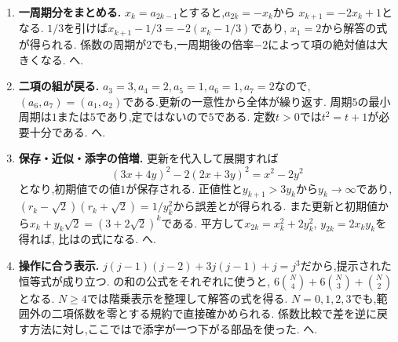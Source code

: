 \begin{enumerate}[label=\textbf{問\arabic*.},format=\bookitemlink{practice-connections}{solution}{problem}]
    \item \textbf{一周期分をまとめる.}
      $x_k=a_{2k-1}$とすると,$a_{2k}=-x_k$から
      $x_{k+1}=-2x_k+1$となる.
      $1/3$を引けば$x_{k+1}-1/3=-2(x_k-1/3)$であり,
      $x_1=2$から解答の式が得られる.
      係数の周期が$2$でも,一周期後の倍率$-2$によって項の絶対値は大きくなる.
      へ.
    \item \textbf{二項の組が戻る.}
      $a_3=3,a_4=2,a_5=1,a_6=1,a_7=2$なので,
      $(a_6,a_7)=(a_1,a_2)$である.更新の一意性から全体が繰り返す.
      周期$5$の最小周期は$1$または$5$であり,定ではないので$5$である.
      定数$t>0$では$t^2=t+1$が必要十分である.
      へ.
    \item \textbf{保存・近似・添字の倍増.}
      更新を代入して展開すれば
      \[
        (3x+4y)^2-2(2x+3y)^2=x^2-2y^2
      \]
      となり,初期値での値$1$が保存される.
      正値性と$y_{k+1}>3y_k$から$y_k\to\infty$であり,
      $(r_k-\sqrt2)(r_k+\sqrt2)=1/y_k^2$から誤差とが得られる.
      また更新と初期値から$x_k+y_k\sqrt2=(3+2\sqrt2)^k$である.
      平方して$x_{2k}=x_k^2+2y_k^2$, $y_{2k}=2x_ky_k$を得れば,
      比はの式になる.
      へ.
    \item \textbf{操作に合う表示.}
      $j(j-1)(j-2)+3j(j-1)+j=j^3$だから,提示された恒等式が成り立つ.
      の和の公式をそれぞれに使うと,
      $6\binom N4+6\binom N3+\binom N2$となる.
      $N\ge4$では階乗表示を整理して解答の式を得る.
      $N=0,1,2,3$でも,範囲外の二項係数を零とする規約で直接確かめられる.
      係数比較で差を逆に戻す方法に対し,ここではで添字が一つ下がる部品を使った.
      へ.
  \end{enumerate}
